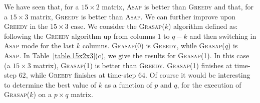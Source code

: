 \documentclass[a4paper,twopages]{article}
\newcommand{\Greedy}{\textsc{Greedy}\xspace}
\newcommand{\ASAP}{\textsc{Asap}\xspace}
\newcommand{\GRASAP}{\textsc{Grasap}}
\begin{document}
We have seen that, for a $15\times 2$ matrix, \ASAP is better than \Greedy and
that, for a $15\times 3$ matrix, \Greedy is better than \ASAP. We can further
improve upon \Greedy in the $15\times 3$ case. We consider the \GRASAP($k$)
algorithm defined as: following the \Greedy algorithm up from columns $1$ to $q-k$
and then switching in \ASAP mode for the last $k$ columns. \GRASAP(0) is
\Greedy, while \GRASAP($q$) is \ASAP.  In
Table~\ref{table.15x2x3}(c), we give the results for \GRASAP(1). In this case
(a $15\times 3$ matrix), \GRASAP(1) is better than \Greedy.  \GRASAP(1) finishes at time-step
$62$, while \Greedy finishes at time-step $64$. Of course it would be interesting to 
determine the best value of $k$ as a function of $p$ and $q$, for the execution of \GRASAP($k$) on a $p \times q$ matrix.

\begin{table}[htbp]
\centering

\end{table}
\end{document}
